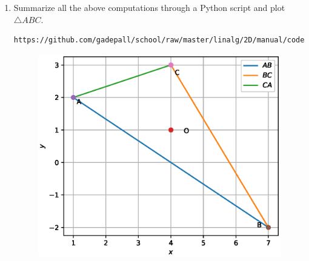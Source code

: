 \documentclass[journal,12pt,twocolumn]{IEEEtran}
\renewcommand\thesection{\arabic{section}}
\begin{document}
\begin{enumerate}[label=\thesection.\arabic*
,ref=\thesection.\theenumi]
\begin{align}
\end{align}
\item Summarize all the above computations through a Python script and plot $\triangle ABC$.
\\
\solution
\begin{lstlisting}
https://github.com/gadepall/school/raw/master/linalg/2D/manual/codes/triang.py
\end{lstlisting}
\begin{figure}
\centering
\includegraphics[width=\columnwidth]{./figs/triangle.eps}
\caption{}
\label{fig:triangle}
\end{figure}
\end{enumerate}
\end{document}
